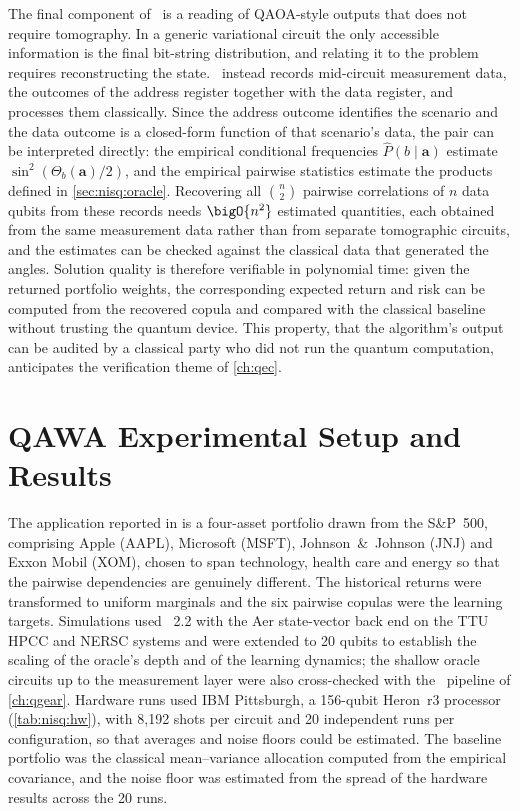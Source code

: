 The final component of \qawa\ is a reading of QAOA-style outputs that does not require tomography. In a generic variational circuit the only accessible information is the final bit-string distribution, and relating it to the problem requires reconstructing the state. \qawa\ instead records mid-circuit measurement data, the outcomes of the address register together with the data register, and processes them classically. Since the address outcome identifies the scenario and the data outcome is a closed-form function of that scenario's data, the pair can be interpreted directly: the empirical conditional frequencies $\hat{P}(b\mid\bm{a})$ estimate $\sin^{2}(\Theta_{b}(\bm{a})/2)$, and the empirical pairwise statistics estimate the products defined in \cref{sec:nisq:oracle}. Recovering all $\binom{n}{2}$ pairwise correlations of $n$ data qubits from these records needs $\bigO{n^{2}}$ estimated quantities, each obtained from the same measurement data rather than from separate tomographic circuits, and the estimates can be checked against the classical data that generated the angles. Solution quality is therefore verifiable in polynomial time: given the returned portfolio weights, the corresponding expected return and risk can be computed from the recovered copula and compared with the classical baseline without trusting the quantum device. This property, that the algorithm's output can be audited by a classical party who did not run the quantum computation, anticipates the verification theme of \cref{ch:qec}.

\section{QAWA Experimental Setup and Results}\label{sec:nisq:qawa-results}

The application reported in \cite{guo2025qawa} is a four-asset portfolio drawn from the S\&P~500, comprising Apple (AAPL), Microsoft (MSFT), Johnson~\&~Johnson (JNJ) and Exxon Mobil (XOM), chosen to span technology, health care and energy so that the pairwise dependencies are genuinely different. The historical returns were transformed to uniform marginals and the six pairwise copulas were the learning targets. Simulations used \qiskit\ 2.2 with the Aer state-vector back end on the TTU HPCC and NERSC systems and were extended to 20 qubits to establish the scaling of the oracle's depth and of the learning dynamics; the shallow oracle circuits up to the measurement layer were also cross-checked with the \qgear\ pipeline of \cref{ch:qgear}. Hardware runs used IBM Pittsburgh, a 156-qubit Heron~r3 processor (\cref{tab:nisq:hw}), with 8,192 shots per circuit and 20 independent runs per configuration, so that averages and noise floors could be estimated. The baseline portfolio was the classical mean--variance allocation computed from the empirical covariance, and the noise floor was estimated from the spread of the hardware results across the 20 runs.

